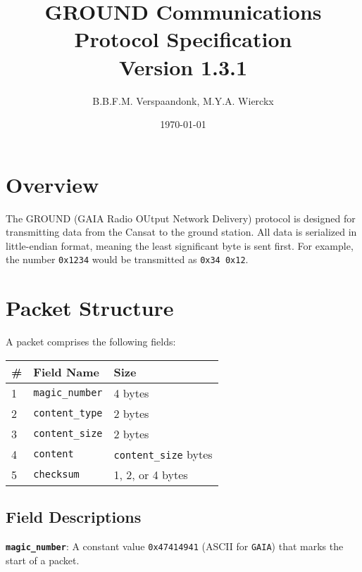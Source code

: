 \documentclass[a4paper]{article}
\title{GROUND Communications Protocol Specification\\ \large Version 1.3.1}
\date{\today}
\author{B.B.F.M. Verspaandonk, M.Y.A. Wierckx}
\begin{document}
\maketitle

\tableofcontents

\section{Overview}
The GROUND (GAIA Radio OUtput Network Delivery) protocol is designed for transmitting data from the Cansat to the ground station. All data is serialized in little-endian format, meaning the least significant byte is sent first. For example, the number \texttt{0x1234} would be transmitted as \texttt{0x34 0x12}.

\section{Packet Structure}
A packet comprises the following fields:
\begin{longtable}{@{}lll@{}}
\toprule
\# & Field Name         & Size                \\
\midrule
1  & \texttt{magic\_number}      & 4 bytes             \\
2  & \texttt{content\_type} & 2 bytes             \\
3  & \texttt{content\_size} & 2 bytes             \\
4  & \texttt{content}     & \texttt{content\_size} bytes \\
5  & \texttt{checksum}    & 1, 2, or 4 bytes      \\
\bottomrule
\end{longtable}

\subsection{Field Descriptions}
\textbf{\texttt{magic\_number}}: A constant value \texttt{0x47414941} (ASCII for \texttt{GAIA}) that marks the start of a packet.
\end{document}
